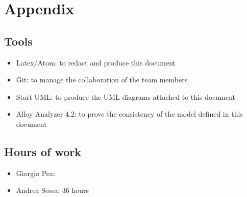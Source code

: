 \documentclass[11pt,titlepage]{article} %
\begin{document}
	\section{Appendix}
	\subsection{Tools}
		\begin{itemize}
			\item Latex/Atom: to redact and produce this document
			\item Git: to manage the collaboration of the team members
			\item Start UML: to produce the UML diagrams attached to this document
			\item Alloy Analyzer 4.2: to prove the consistency of the model defined in this document
		\end{itemize}
	\subsection{Hours of work}
		\begin{itemize}
			\item Giorgio Pea: 
			\item Andrea Sessa: 36 hours
		\end{itemize}
		
\end{document}
